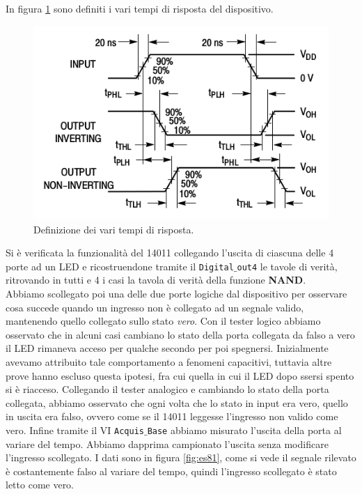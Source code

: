 \documentclass[journal, a4paper]{IEEEtran}
\begin{document}
In figura \ref{fig:response} sono definiti i vari tempi di risposta del dispositivo.

\begin{figure}[htp]
\centering
\includegraphics[scale=.5]{response}
\caption{Definizione dei vari tempi di risposta.}
\label{fig:response}
\end{figure}

Si è verificata la funzionalità del 14011 collegando l'uscita di ciascuna delle 4 porte ad un LED e ricostruendone tramite il \texttt{Digital$\_$out4} le tavole di verità, ritrovando in tutti e 4 i casi la tavola di verità della funzione \textbf{NAND}.\\

Abbiamo scollegato poi una delle due porte logiche dal dispositivo per osservare cosa succede quando un ingresso non è collegato ad un segnale valido, mantenendo quello collegato sullo stato \textit{vero}. Con il tester logico abbiamo osservato che in alcuni casi cambiano lo stato della porta collegata da falso a vero il LED rimaneva acceso per qualche secondo per poi spegnersi. Inizialmente avevamo attribuito tale comportamento a fenomeni capacitivi, tuttavia altre prove hanno escluso questa ipotesi, fra cui quella in cui il LED dopo ssersi spento si è riacceso. Collegando il tester analogico e cambiando lo stato della porta collegata, abbiamo osservato che ogni volta che lo stato in input era vero, quello in uscita era falso, ovvero come se il 14011 leggesse l'ingresso non valido come vero. Infine tramite il VI \texttt{Acquis$\_$Base} abbiamo misurato l'uscita della porta al variare del tempo. Abbiamo dapprima campionato l'uscita senza modificare l'ingresso scollegato. I dati sono in figura \ref{fig:es81}, come si vede il segnale rilevato è costantemente falso al variare del tempo, quindi l'ingresso scollegato è stato letto come vero.
\end{document}
